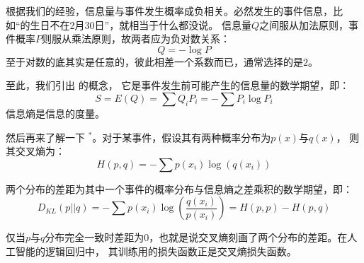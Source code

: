 根据我们的经验，信息量与事件发生概率成负相关。必然发生的事件信息，比如``\dove 的生日不在2月30日''，就相当于什么都没说。
信息量$Q$之间服从加法原则，事件概率$P$则服从乘法原则，故两者应为负对数关系：
\begin{equation}
    Q = - \log P
    \nonumber
\end{equation}
至于对数的底其实是任意的，彼此相差一个系数而已，通常选择的是$2$。

至此，我们引出  的概念，
它是事件发生前可能产生的信息量的数学期望，即：
\begin{equation}
    S = E(Q) = \sum Q_{i}P_{i} = -\sum P_{i}\log P_{i}
    \nonumber
\end{equation}
信息熵是信息的度量。

然后再来了解一下 $^*$。对于某事件，假设其有两种概率分布为$p(x)$与$q(x)$，
则其交叉熵为：
\begin{equation}
    H(p,q) = - \sum p({x_{i}})\log(q({x_{i}}))
    \nonumber
\end{equation}

两个分布的差距为其中一个事件的概率分布与信息熵之差乘积的数学期望，即：
\begin{equation}
    D_{KL}(p||q) = - \sum p({x_{i}})\log(\frac{q({x_{i}})}{p({x_{i}})}) = H(p,p)-H(p,q)
    \nonumber
\end{equation}

仅当$p$与$q$分布完全一致时差距为$0$，也就是说交叉熵刻画了两个分布的差距。在人工智能的逻辑回归中，
其训练用的损失函数正是交叉熵损失函数。

